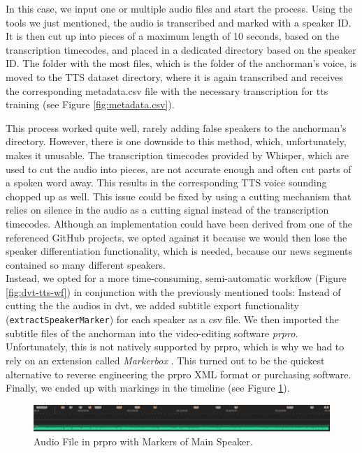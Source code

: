 \documentclass[
  a4paper,  %
  twoside,  %
  bibliography=totoc,
  headsepline,
  cleardoublepage=empty,
  parskip=half,
  draft=false
]{scrbook}
\begin{document}
In this case, we input one or multiple audio files and start the process. Using the tools we just mentioned, the audio is transcribed and marked with a speaker ID.
It is then cut up into pieces of a maximum length of 10 seconds, based on the transcription timecodes, and placed in a dedicated directory based on the speaker ID. The folder with the most files, which is the folder of the anchorman's voice, is moved to the TTS dataset directory, where it is again transcribed and receives the corresponding metadata.csv file with the necessary transcription for \gls{tts} training (see Figure \ref{fig:metadata.csv}).

This process worked quite well, rarely adding false speakers to the anchorman's directory. However, there is one downside to this method, which, unfortunately, makes it unusable. The transcription timecodes provided by Whisper, which are used to cut the audio into pieces, are not accurate enough and often cut parts of a spoken word away. This results in the corresponding TTS voice sounding chopped up as well. This issue could be fixed by using a cutting mechanism that relies on silence in the audio as a cutting signal instead of the transcription timecodes. Although an implementation could have been derived from one of the referenced GitHub projects, we opted against it because we would then lose the speaker differentiation functionality, which is needed, because our news segments contained so many different speakers. \\
Instead, we opted for a more time-consuming, semi-automatic workflow (Figure \ref{fig:dvt-tts-wf}) in conjunction with the previously mentioned tools: Instead of cutting the the audios in \gls{dvt}, we added subtitle export functionality (\verb|extractSpeakerMarker|) for each speaker as a csv file. We then imported the subtitle files of the anchorman into the video-editing software \textit{\gls{prpro}}. Unfortunately, this is not natively supported by \gls{prpro}, which is why we had to rely on an extension called \textit{Markerbox} \cite{montgomeryMARKERBOXFreeMarker}. This turned out to be the quickest alternative to reverse engineering the \gls{prpro} XML format or purchasing software. Finally, we ended up with markings in the timeline (see Figure \ref{fig:premier-markers}). 

\begin{figure}[h]
  \centering
  \includegraphics[width=1\textwidth]{./graphics/tts/premier with markers.png}
  \caption{Audio File in \gls{prpro} with Markers of Main Speaker.}
  \label{fig:premier-markers}
\end{figure}
\end{document}
